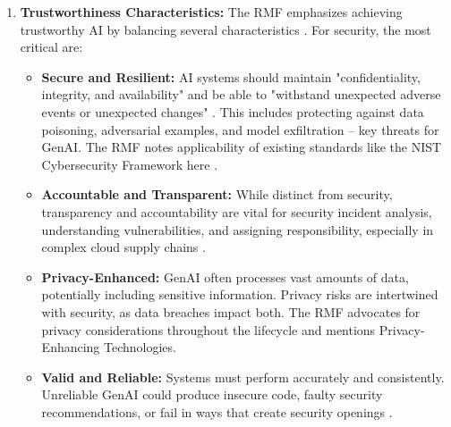 \begin{enumerate}
    \item \textbf{Trustworthiness Characteristics:} The RMF emphasizes achieving trustworthy AI by balancing several characteristics \cite{tabassi_artificial_2023}. For security, the most critical are:
    \begin{itemize}
      \item \textbf{Secure and Resilient:} AI systems should maintain "confidentiality, integrity, and availability" and be able to "withstand unexpected adverse events or unexpected changes" \cite[p.15]{tabassi_artificial_2023}. This includes protecting against data poisoning, adversarial examples, and model exfiltration – key threats for GenAI. The RMF notes applicability of existing standards like the NIST Cybersecurity Framework here \cite[p.15]{tabassi_artificial_2023}.
        \item \textbf{Accountable and Transparent:} While distinct from security, transparency and accountability are vital for security incident analysis, understanding vulnerabilities, and assigning responsibility, especially in complex cloud supply chains \cite{tabassi_artificial_2023}.
        \item \textbf{Privacy-Enhanced:} GenAI often processes vast amounts of data, potentially including sensitive information. Privacy risks are intertwined with security, as data breaches impact both. The RMF advocates for privacy considerations throughout the lifecycle and mentions Privacy-Enhancing Technologies\cite{tabassi_artificial_2023}.
        \item \textbf{Valid and Reliable:} Systems must perform accurately and consistently. Unreliable GenAI could produce insecure code, faulty security recommendations, or fail in ways that create security openings \cite{tabassi_artificial_2023}.
    \end{itemize}


\end{enumerate}
